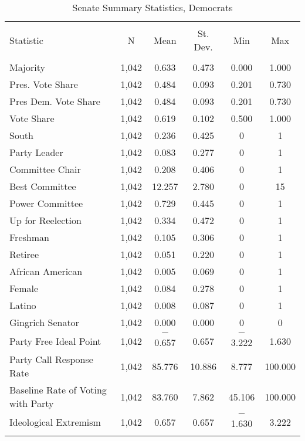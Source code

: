 \documentclass[12pt]{article}
\begin{document}
\begin{table}[!htbp] \centering 
	\caption{Senate Summary Statistics, Democrats} 
	\label{} 
	\begin{tabular}{@{\extracolsep{5pt}}lccccc} 
		\\[-1.8ex]\hline 
		\hline \\[-1.8ex] 
		Statistic & \multicolumn{1}{c}{N} & \multicolumn{1}{c}{Mean} & \multicolumn{1}{c}{St. Dev.} & \multicolumn{1}{c}{Min} & \multicolumn{1}{c}{Max} \\ 
		\hline \\[-1.8ex] 
		Majority & 1,042 & 0.633 & 0.473 & 0.000 & 1.000 \\ 
		Pres. Vote Share & 1,042 & 0.484 & 0.093 & 0.201 & 0.730 \\ 
		Pres Dem. Vote Share & 1,042 & 0.484 & 0.093 & 0.201 & 0.730 \\ 
		Vote Share & 1,042 & 0.619 & 0.102 & 0.500 & 1.000 \\ 
		South & 1,042 & 0.236 & 0.425 & 0 & 1 \\ 
		Party Leader & 1,042 & 0.083 & 0.277 & 0 & 1 \\ 
		Committee Chair & 1,042 & 0.208 & 0.406 & 0 & 1 \\ 
		Best Committee & 1,042 & 12.257 & 2.780 & 0 & 15 \\ 
		Power Committee & 1,042 & 0.729 & 0.445 & 0 & 1 \\ 
		Up for Reelection & 1,042 & 0.334 & 0.472 & 0 & 1 \\ 
		Freshman & 1,042 & 0.105 & 0.306 & 0 & 1 \\  
		Retiree & 1,042 & 0.051 & 0.220 & 0 & 1 \\ 
		African American & 1,042 & 0.005 & 0.069 & 0 & 1 \\ 
		Female & 1,042 & 0.084 & 0.278 & 0 & 1 \\ 
		Latino & 1,042 & 0.008 & 0.087 & 0 & 1 \\ 
		Gingrich Senator & 1,042 & 0.000 & 0.000 & 0 & 0 \\ 
		Party Free Ideal Point & 1,042 & $-$0.657 & 0.657 & $-$3.222 & 1.630 \\ 
		Party Call Response Rate & 1,042 & 85.776 & 10.886 & 8.777 & 100.000 \\ 
		Baseline Rate of Voting with Party & 1,042 & 83.760 & 7.862 & 45.106 & 100.000 \\ 
		Ideological Extremism & 1,042 & 0.657 & 0.657 & $-$1.630 & 3.222 \\ 
		\hline \\[-1.8ex] 
	\end{tabular} 
\end{table} 
\end{document}
